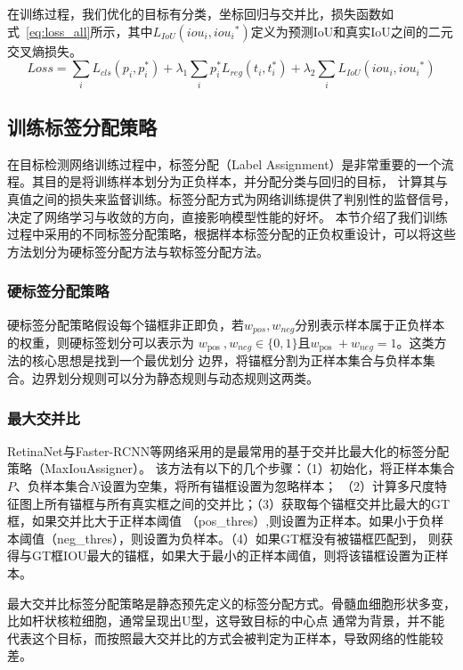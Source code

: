 在训练过程，我们优化的目标有分类，坐标回归与交并比，损失函数如式~\ref{eq:loss_all}所示，其中${{L_{IoU}}(io{u_i},io{u_i}^*)}$定义为预测IoU和真实IoU之间的二元交叉熵损失。
\begin{equation}   
  Loss = \sum\limits_i {{L_{cls}}} \left( {{p_i},p_i^*} \right) + {\lambda _1}\sum\limits_i {p_i^*} {L_{reg}}\left( {{t_i},t_i^*} \right) + {\lambda _2}\sum\limits_i {{L_{IoU}}(io{u_i},io{u_i}^*)} 
  \label{eq:loss_all} 
\end{equation}

\subsection{训练标签分配策略}
  在目标检测网络训练过程中，标签分配（Label Assignment）是非常重要的一个流程。其目的是将训练样本划分为正负样本，并分配分类与回归的目标，
  计算其与真值之间的损失来监督训练。标签分配方式为网络训练提供了判别性的监督信号，决定了网络学习与收敛的方向，直接影响模型性能的好坏。
  本节介绍了我们训练过程中采用的不同标签分配策略，根据样本标签分配的正负权重设计，可以将这些方法划分为硬标签分配方法与软标签分配方法。

\subsubsection{硬标签分配策略}
硬标签分配策略假设每个锚框非正即负，若$w_{pos}, w_{neg}$分别表示样本属于正负样本的权重，则硬标签划分可以表示为
$w_{\text {pos }}, w_{n e g} \in\{0,1\}$且$w_{\text {pos }} +  w_{n e g} = 1$。这类方法的核心思想是找到一个最优划分
边界，将锚框分割为正样本集合与负样本集合。边界划分规则可以分为静态规则与动态规则这两类。

\subsubsection{最大交并比}
RetinaNet与Faster-RCNN等网络采用的是最常用的基于交并比最大化的标签分配策略（MaxIouAssigner）。
该方法有以下的几个步骤：（1）初始化，将正样本集合$P$、负样本集合$N$设置为空集，将所有锚框设置为忽略样本；
（2）计算多尺度特征图上所有锚框与所有真实框之间的交并比；（3）获取每个锚框交并比最大的GT框，如果交并比大于正样本阈值
（pos\_thres）,则设置为正样本。如果小于负样本阈值（neg\_thres），则设置为负样本。（4）如果GT框没有被锚框匹配到，
则获得与GT框IOU最大的锚框，如果大于最小的正样本阈值，则将该锚框设置为正样本。

最大交并比标签分配策略是静态预先定义的标签分配方式。骨髓血细胞形状多变，比如杆状核粒细胞，通常呈现出U型，这导致目标的中心点
通常为背景，并不能代表这个目标，而按照最大交并比的方式会被判定为正样本，导致网络的性能较差。
